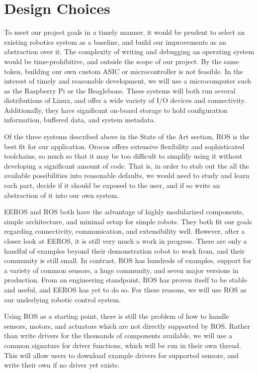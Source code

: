 \documentclass[10pt]{article}
\begin{document}
\section{Design Choices}
To meet our project goals in a timely manner, it would be prudent to select an existing robotics system as a baseline, and build our improvements as an abstraction over it.  The complexity of writing and debugging an operating system would be time-prohibitive, and outside the scope of our project.  By the same token, building our own custom ASIC or microcontroller is not feasible.  In the interest of timely and reasonable development, we will use a microcomputer such as the Raspberry Pi or the Beaglebone.  These systems will both run several distributions of Linux, and offer a wide variety of I/O devices and connectivity.  Additionally, they have significant on-board storage to hold configuration information, buffered data, and system metadata.

Of the three systems described above in the State of the Art section, ROS is the best fit for our application.  Orocos offers extensive flexibility and sophisticated toolchains, so much so that it may be too difficult to simplify using it without developing a significant amount of code.  That is, in order to stub out the all the available possibilities into reasonable defaults, we would need to study and learn each part, decide if it should be exposed to the user, and if so write an abstraction of it into our own system.

EEROS and ROS both have the advantage of highly modularized components, simple architecture, and minimal setup for simple robots.  They both fit our goals regarding connectivity, communication, and extensibility well.  However, after a closer look at EEROS, it is still very much a work in progress.  There are only a handful of examples beyond their demonstration robot to work from, and their community is still small.  In contrast, ROS has hundreds of examples, support for a variety of common sensors, a huge community, and seven major versions in production.  From an engineering standpoint, ROS has proven itself to be stable and useful, and EEROS has yet to do so.  For these reasons, we will use ROS as our underlying robotic control system.

Using ROS as a starting point, there is still the problem of how to handle sensors, motors, and actuators which are not directly supported by ROS.  Rather than write drivers for the thousands of components available, we will use a common signature for driver functions, which will be run in their own thread.  This will allow users to download example drivers for supported sensors, and write their own if no driver yet exists.
\end{document}

